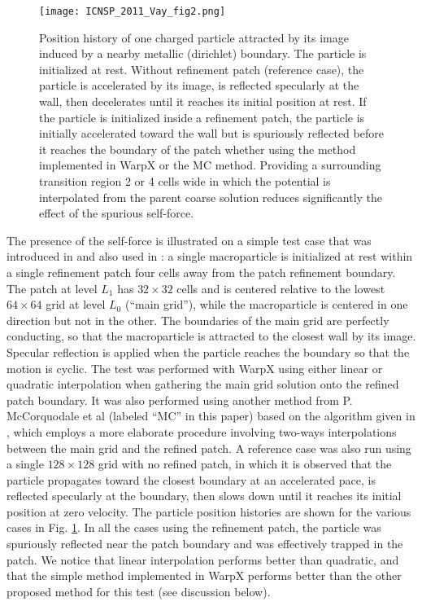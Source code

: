 \begin{figure}[htb]
  \centering
  \texttt{[image: ICNSP\_2011\_Vay\_fig2.png]}
  \caption{Position history of one charged particle attracted by its image induced by a nearby metallic (dirichlet) boundary. The particle is initialized at rest. Without refinement patch (reference case), the particle is accelerated by its image, is reflected specularly at the wall, then decelerates until it reaches its initial position at rest. If the particle is initialized inside a refinement patch, the particle is initially accelerated toward the wall but is spuriously reflected before it reaches the boundary of the patch whether using the method implemented in WarpX or the MC method. Providing a surrounding transition region 2 or 4 cells wide in which the potential is interpolated from the parent coarse solution reduces significantly the effect of the spurious self-force. }
  \label{fig:ESselfforce}
\end{figure}
The presence of the self-force is illustrated on a simple test case that was introduced in \cite{Vaylpb2002} and also used in \cite{Colellajcp2010}: a single macroparticle is initialized at rest within a single refinement patch four cells away from the patch refinement boundary. The patch at level $L_1$ has $32\times32$ cells and is centered relative to the lowest $64\times64$ grid at level $L_0$ (``main grid''), while the macroparticle is centered in one direction but not in the other. The boundaries of the main grid are perfectly conducting, so that the macroparticle is attracted to the closest wall by its image. Specular reflection is applied when the particle reaches the boundary so that the motion is cyclic. The test was performed with WarpX using either linear or quadratic interpolation when gathering the main grid solution onto the refined patch boundary. It was also performed using another method from P. McCorquodale et al (labeled ``MC'' in this paper) based on the algorithm given in \cite{Mccorquodalejcp2004}, which employs a more elaborate procedure involving two-ways interpolations between the main grid and the refined patch. A reference case was also run using a single $128\times128$ grid with no refined patch, in which it is observed that the particle propagates toward the closest boundary at an accelerated pace, is reflected specularly at the boundary, then slows down until it reaches its initial position at zero velocity. The particle position histories are shown for the various cases in Fig. \ref{fig:ESselfforce}. In all the cases using the refinement patch, the particle was spuriously reflected near the patch boundary and was effectively trapped in the patch. We notice that linear interpolation performs better than quadratic, and that the simple method implemented in WarpX performs better than the other proposed method for this test (see discussion below).

